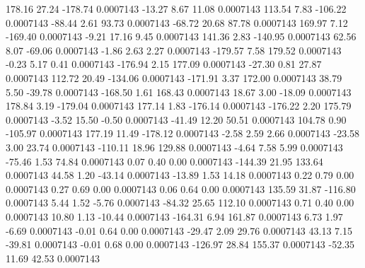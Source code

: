       178.16       27.24     -178.74     0.0007143
      -13.27        8.67       11.08     0.0007143
      113.54        7.83     -106.22     0.0007143
      -88.44        2.61       93.73     0.0007143
      -68.72       20.68       87.78     0.0007143
      169.97        7.12     -169.40     0.0007143
       -9.21       17.16        9.45     0.0007143
      141.36        2.83     -140.95     0.0007143
       62.56        8.07      -69.06     0.0007143
       -1.86        2.63        2.27     0.0007143
     -179.57        7.58      179.52     0.0007143
       -0.23        5.17        0.41     0.0007143
     -176.94        2.15      177.09     0.0007143
      -27.30        0.81       27.87     0.0007143
      112.72       20.49     -134.06     0.0007143
     -171.91        3.37      172.00     0.0007143
       38.79        5.50      -39.78     0.0007143
     -168.50        1.61      168.43     0.0007143
       18.67        3.00      -18.09     0.0007143
      178.84        3.19     -179.04     0.0007143
      177.14        1.83     -176.14     0.0007143
     -176.22        2.20      175.79     0.0007143
       -3.52       15.50       -0.50     0.0007143
      -41.49       12.20       50.51     0.0007143
      104.78        0.90     -105.97     0.0007143
      177.19       11.49     -178.12     0.0007143
       -2.58        2.59        2.66     0.0007143
      -23.58        3.00       23.74     0.0007143
     -110.11       18.96      129.88     0.0007143
       -4.64        7.58        5.99     0.0007143
      -75.46        1.53       74.84     0.0007143
        0.07        0.40        0.00     0.0007143
     -144.39       21.95      133.64     0.0007143
       44.58        1.20      -43.14     0.0007143
      -13.89        1.53       14.18     0.0007143
        0.22        0.79        0.00     0.0007143
        0.27        0.69        0.00     0.0007143
        0.06        0.64        0.00     0.0007143
      135.59       31.87     -116.80     0.0007143
        5.44        1.52       -5.76     0.0007143
      -84.32       25.65      112.10     0.0007143
        0.71        0.40        0.00     0.0007143
       10.80        1.13      -10.44     0.0007143
     -164.31        6.94      161.87     0.0007143
        6.73        1.97       -6.69     0.0007143
       -0.01        0.64        0.00     0.0007143
      -29.47        2.09       29.76     0.0007143
       43.13        7.15      -39.81     0.0007143
       -0.01        0.68        0.00     0.0007143
     -126.97       28.84      155.37     0.0007143
      -52.35       11.69       42.53     0.0007143
